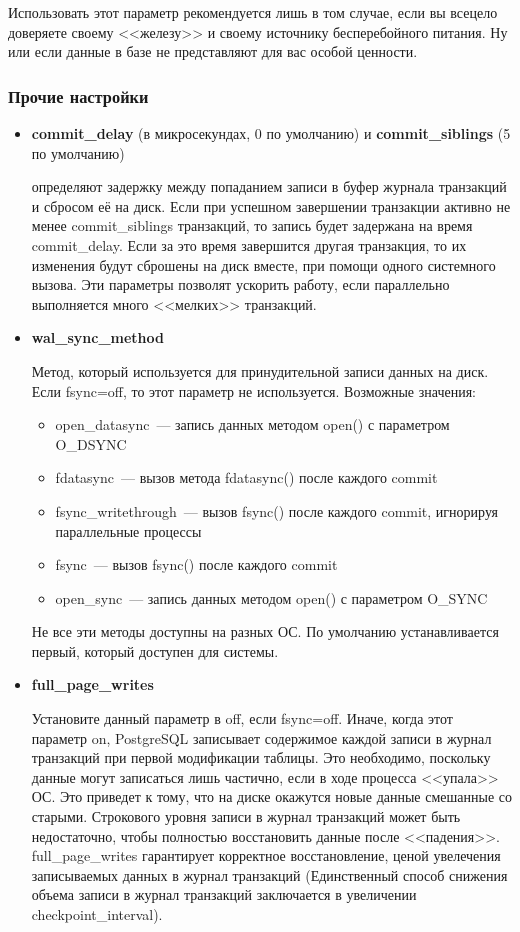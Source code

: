 Использовать этот параметр рекомендуется лишь в том случае, если вы всецело доверяете своему <<железу>> и своему источнику 
бесперебойного питания. Ну или если данные в базе не представляют для вас особой ценности.

\subsubsection{Прочие настройки}
\begin{itemize}
\item 
\textbf{commit\_delay} (в микросекундах, 0 по умолчанию) и \textbf{commit\_sib\-lings} (5 по умолчанию) 

определяют задержку между попаданием записи в буфер журнала транзакций и сбросом её на диск. 
Если при успешном завершении транзакции активно не менее commit\_siblings транзакций, то запись будет задержана на время 
commit\_delay. Если за это время завершится другая транзакция, то их изменения будут сброшены на диск вместе, при помощи 
одного системного вызова. Эти параметры позволят ускорить работу, если параллельно выполняется много <<мелких>> транзакций.

\item \textbf{wal\_sync\_method}

Метод, который используется для принудительной записи данных на диск.
Если fsync=off, то этот параметр не используется.
Возможные значения:
\begin{itemize}
\item open\_datasync~--- запись данных методом open() с параметром O\_DSYNC
\item fdatasync~--- вызов метода fdatasync() после каждого commit
\item fsync\_writethrough~--- вызов fsync() после каждого commit, игнорируя параллельные процессы
\item fsync~--- вызов fsync() после каждого commit
\item open\_sync~--- запись данных методом open() с параметром O\_SYNC
\end{itemize}

Не все эти методы доступны на разных ОС. По умолчанию устанавливается первый, который доступен для системы.

\item \textbf{full\_page\_writes}

Установите данный параметр в off, если fsync=off. Иначе, когда этот параметр on, PostgreSQL записывает содержимое 
каждой записи в журнал транзакций при первой модификации таблицы. Это необходимо, поскольку 
данные могут записаться лишь частично, если в ходе процесса <<упала>> ОС. Это приведет к тому, что на диске окажутся 
новые данные смешанные со старыми. Строкового уровня записи в журнал транзакций может быть недостаточно, чтобы полностью 
восстановить данные после <<падения>>. full\_page\_writes гарантирует корректное восстановление, ценой увелечения записываемых 
данных в журнал транзакций (Единственный способ снижения объема записи в журнал транзакций заключается в 
увеличении checkpoint\_interval).


\end{itemize}
